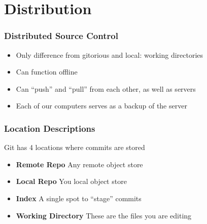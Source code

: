 \section{Distribution}

\begin{frame}
  \frametitle{Distributed Source Control}
  \begin{itemize}
  \item Only difference from gitorious and local: working directories
    \pause
  \item Can function offline
    \pause
  \item Can ``push'' and ``pull'' from each other, as well as servers
    \pause
  \item Each of our computers serves as a backup of the server
  \end{itemize}
\end{frame}

\begin{frame}
  \frametitle{Location Descriptions}
  Git has 4 locations where commits are stored
  \pause
  \begin{itemize}
  \item \textbf{Remote Repo} Any remote object store
    \pause
  \item \textbf{Local Repo} You local object store
    \pause
  \item \textbf{Index} A single spot to ``stage'' commits
    \pause
  \item \textbf{Working Directory} These are the files you are editing
  \end{itemize}
\end{frame}

